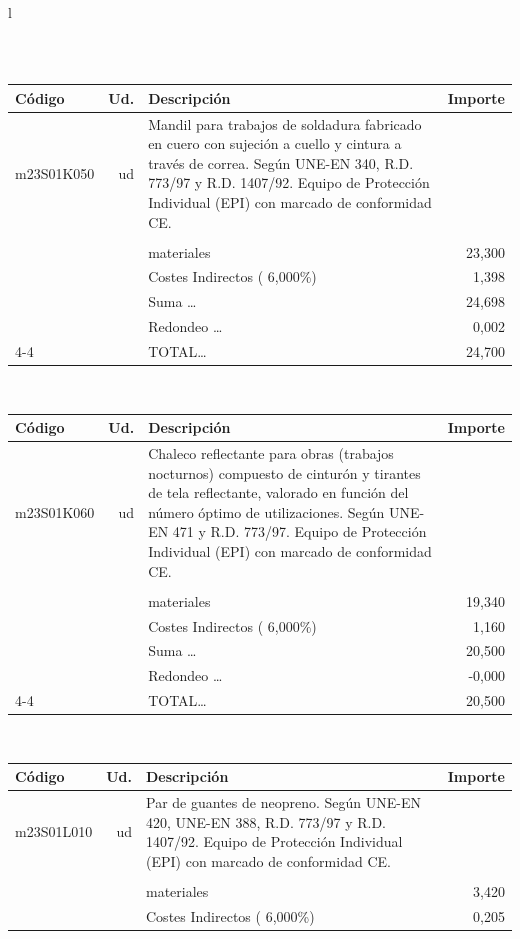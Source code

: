 \documentclass{book}%
\begin{document}
\begin{longtable}{l}
\begin{tabular}{l r p{60mm} r}
\end{tabular}\\%
\begin{tabular}{l r p{60mm} r}%
Código&Ud.&Descripción&Importe\\%
\hline%
m23S01K050&ud&Mandil para trabajos de soldadura fabricado en cuero con sujeción a cuello y cintura a través de correa. Según UNE{-}EN 340, R.D. 773/97 y R.D. 1407/92. Equipo de Protección Individual (EPI) con marcado de conformidad CE.&\\%
&&&\\%
&&materiales&    23,300\\%
&&Costes Indirectos (     6,000\%)&     1,398\\%
&&Suma \ldots&    24,698\\%
&&Redondeo \ldots&     0,002\\%
\cline{4-4}%
&&TOTAL\ldots&    24,700\\%
\end{tabular}\\%
\begin{tabular}{l r p{60mm} r}%
Código&Ud.&Descripción&Importe\\%
\hline%
m23S01K060&ud&Chaleco reflectante para obras (trabajos nocturnos) compuesto de cinturón y tirantes de tela reflectante, valorado en función del número óptimo de utilizaciones. Según UNE{-}EN 471 y R.D. 773/97. Equipo de Protección Individual (EPI) con marcado de conformidad CE.&\\%
&&&\\%
&&materiales&    19,340\\%
&&Costes Indirectos (     6,000\%)&     1,160\\%
&&Suma \ldots&    20,500\\%
&&Redondeo \ldots&    {-}0,000\\%
\cline{4-4}%
&&TOTAL\ldots&    20,500\\%
\end{tabular}\\%
\begin{tabular}{l r p{60mm} r}%
Código&Ud.&Descripción&Importe\\%
\hline%
m23S01L010&ud&Par de guantes de neopreno. Según UNE{-}EN 420, UNE{-}EN 388, R.D. 773/97 y R.D. 1407/92. Equipo de Protección Individual (EPI) con marcado de conformidad CE.&\\%
&&&\\%
&&materiales&     3,420\\%
&&Costes Indirectos (     6,000\%)&     0,205\\%

\end{tabular}
\end{longtable}
\end{document}
